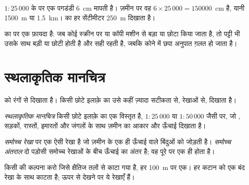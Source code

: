 \begin{example}[$1 : 25\,000$ के मानचित्र पर एक सैर]
$1 : 25\,000$ के  पर एक पगडंडी \qty{6}{cm} मापती है। ज़मीन पर
वह $6 \times 25\,000 = \num{150000}$~cm है, यानी \qty{1500}{m} या
\qty{1.5}{km}।  का हर सेंटीमीटर \qty{250}{m} दिखाता है।
\end{example}

 का  पर एक फ़ायदा है: जब कोई  स्क्रीन पर या कॉपी मशीन
से बड़ा या छोटा किया जाता है, तो पट्टी भी उसके साथ बड़ी या छोटी होती है और सही रहती है, जबकि
कोने में छपा अनुपात ग़लत हो जाता
है।

\section{स्थलाकृतिक मानचित्र}

  को रंगों से दिखाता है। किसी छोटे इलाक़े का  उसे कहीं ज़्यादा
सटीकता से, रेखाओं से, दिखाता है।

\begin{definition}[स्थलाकृतिक मानचित्र]\label{def:g9:maps-of-the-earth:topographic-map}
\emph{स्थलाकृतिक मानचित्र} किसी छोटे इलाक़े का एक विस्तृत
 है, $1 : 25\,000$ या $1 : 50\,000$ जैसी  पर, जो , सड़कों,
रास्तों, इमारतों और जंगलों के साथ ज़मीन का आकार और ऊँचाई दिखाता
है।
\end{definition}

\begin{definition}[समोच्च रेखा और समोच्च अंतराल]\label{def:g9:maps-of-the-earth:contour}
\emph{समोच्च रेखा}  पर एक ऐसी रेखा है जो ज़मीन के एक ही
ऊँचाई वाले बिंदुओं को जोड़ती है। \emph{समोच्च
अंतराल} दो पड़ोसी समोच्च रेखाओं के बीच ऊँचाई का अंतर है; वह पूरे
 पर एक ही होता है।
\end{definition}

किसी  की कल्पना करो जिसे क्षैतिज तलों से काटा गया है, हर \qty{100}{m} पर एक। हर
कटान  को एक बंद रेखा के साथ काटता है; ऊपर से देखने पर ये रेखाएँ 
हैं।

